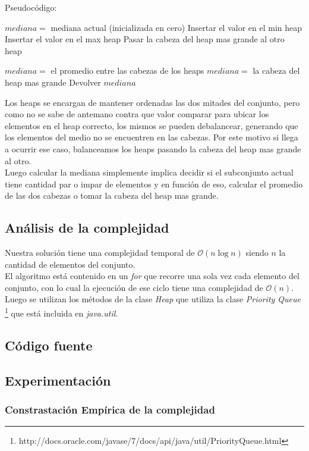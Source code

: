 Pseudocódigo:
\begin{algorithmic}
	\STATE $mediana =$ mediana actual (inicializada en cero)
			\STATE Insertar el valor en el min heap
		\ELSE
			\STATE Insertar el valor en el max heap
		\ENDIF
			\STATE Pasar la cabeza del heap mas grande al otro heap
		\ENDIF

			\STATE $mediana = $ el promedio entre las cabezas de los heaps
		\ELSE
			\STATE $mediana = $ la cabeza del heap mas grande
		\ENDIF
		\STATE Devolver $mediana$
	\ENDFOR
\end{algorithmic}


Los heaps se encargan de mantener ordenadas las dos mitades del conjunto, pero como no se sabe de antemano contra que valor comparar para ubicar los elementos en el heap correcto, los mismos se pueden debalancear, generando que los elementos del medio no se encuentren en las cabezas. Por este motivo si llega a ocurrir ese caso, balanceamos los heaps pasando la cabeza del heap mas grande al otro.\\

Luego calcular la mediana simplemente implica decidir si el subconjunto actual tiene cantidad par o impar de elementos y en función de eso, calcular el promedio de las dos cabezas o tomar la cabeza del heap mas grande.
\subsection{Análisis de la complejidad}
Nuestra solución tiene una complejidad temporal de $\mathcal{O}(n\log{}n)$ siendo $n$ la cantidad de elementos del conjunto. \\

El algoritmo está contenido en un \emph{for} que recorre una sola vez cada elemento del conjunto, con lo cual la ejecución de ese ciclo tiene una complejidad de $\mathcal{O}(n)$. Luego se utilizan los métodos de la clase \emph{Heap} que utiliza la clase \emph{Priority Queue} \footnote{http://docs.oracle.com/javase/7/docs/api/java/util/PriorityQueue.html} que está incluida en \emph{java.util}.
\subsection{Código fuente}





\subsection{Experimentación}

\subsubsection{Constrastación Empírica de la complejidad}

